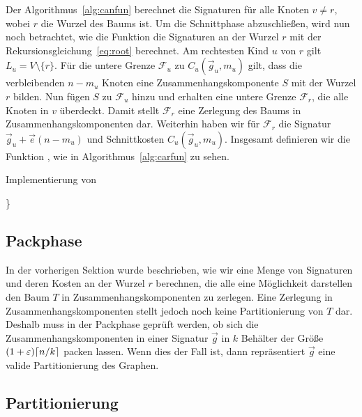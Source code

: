 Der Algorithmus~\ref{alg:canfun} berechnet die Signaturen für alle Knoten $v \neq r$, wobei $r$ die Wurzel des Baums ist.
Um die Schnittphase abzuschließen, wird nun noch betrachtet, wie die Funktion \carfun{} die Signaturen an der Wurzel $r$ mit der Rekursionsgleichung~\eqref{eq:root} berechnet.
Am rechtesten Kind $u$ von $r$ gilt $L_u = V \setminus \{r\}$.
Für die untere Grenze $\mathcal{F}_u$ zu $C_u(\vec{g}_u, m_u)$ gilt, dass die verbleibenden $n - m_u$ Knoten eine Zusammenhangskomponente $S$ mit der Wurzel $r$ bilden.
Nun fügen $S$ zu $\mathcal{F}_u$ hinzu und erhalten eine untere Grenze $\mathcal{F}_r$, die alle Knoten in $v$ überdeckt.
Damit stellt $\mathcal{F}_r$ eine Zerlegung des Baums in Zusammenhangskomponenten dar.
Weiterhin haben wir für $\mathcal{F}_r$ die Signatur $\vec{g}_u + \vec{e}(n - m_u)$ und Schnittkosten $C_u(\vec{g}_u, m_u)$.
Insgesamt definieren wir die Funktion \carfun{}, wie in Algorithmus~\ref{alg:carfun} zu sehen.

\begin{algorithm}
    \caption{Implementierung von \carfun{}}\label{alg:carfun}
    \begin{algorithmic}
                    \}
                \EndFor
           \EndFor
        \EndFunction
    \end{algorithmic}
\end{algorithm}

\subsection{Packphase}
In der vorherigen Sektion wurde beschrieben, wie wir eine Menge von Signaturen und deren Kosten an der Wurzel $r$ berechnen, die alle eine Möglichkeit darstellen den Baum $T$ in Zusammenhangskomponenten zu zerlegen.
Eine Zerlegung in Zusammenhangskomponenten stellt jedoch noch keine Partitionierung von $T$ dar.
Deshalb muss in der Packphase geprüft werden, ob sich die Zusammenhangskomponenten in einer Signatur $\vec{g}$ in $k$ Behälter der Größe $(1+\varepsilon)\lceil n/k\rceil$ packen lassen.
Wenn dies der Fall ist, dann repräsentiert $\vec{g}$ eine valide Partitionierung des Graphen.

\subsection{Partitionierung}

